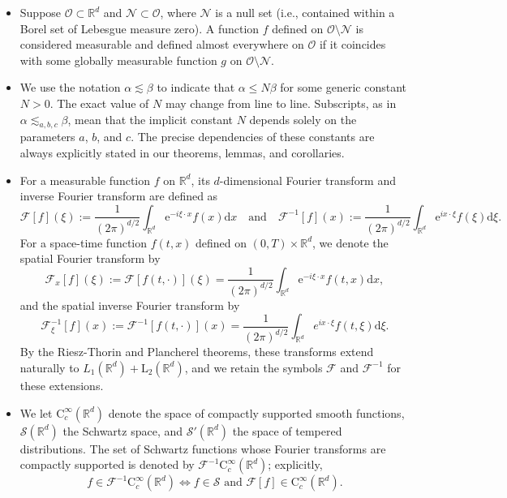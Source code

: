 \documentclass[11pt,reqno]{amsart}
\theoremstyle{definition}
\theoremstyle{remark}
\numberwithin{equation}{section}
\begin{document}
\begin{itemize}
\item Suppose $\mathcal{O} \subset \mathbb{R}^d$ and $\mathcal{N} \subset \mathcal{O}$, where $\mathcal{N}$ is a null set (i.e., contained within a Borel set of Lebesgue measure zero). A function $f$ defined on $\mathcal{O} \setminus \mathcal{N}$ is considered measurable and defined almost everywhere on $\mathcal{O}$ if it coincides with some globally measurable function $g$ on $\mathcal{O} \setminus \mathcal{N}$.

\item We use the notation $\alpha \lesssim \beta$ to indicate that $\alpha \leq N \beta$ for some generic constant $N > 0$. 
The exact value of $N$ may change from line to line. 
Subscripts, as in $\alpha \lesssim_{a,b,c} \beta$, mean that the implicit constant $N$ depends solely on the parameters $a$, $b$, and $c$.
The precise dependencies of these constants are always explicitly stated in our theorems, lemmas, and corollaries.

\item For a measurable function $f$ on $\mathbb{R}^d$, its $d$-dimensional Fourier transform and inverse Fourier transform are defined as
$$
\mathcal{F}[f](\xi) := \frac{1}{(2\pi)^{d/2}}\int_{\mathbb{R}^{d}} \mathrm{e}^{-i\xi \cdot x} f(x) \mathrm{d}x \quad \text{and} \quad \mathcal{F}^{-1}[f](x) := \frac{1}{(2\pi)^{d/2}}\int_{\mathbb{R}^{d}} \mathrm{e}^{ ix \cdot \xi} f(\xi) \mathrm{d}\xi.
$$
For a space-time function $f(t,x)$ defined on $(0,T)\times \mathbb{R}^d$, we denote the spatial Fourier transform by
$$
\mathcal{F}_x[f](\xi) := \mathcal{F}[f(t,\cdot)](\xi) = \frac{1}{(2\pi)^{d/2}}\int_{\mathbb{R}^{d}} \mathrm{e}^{ -i\xi \cdot x} f(t,x) \mathrm{d}x,
$$
and the spatial inverse Fourier transform by
$$
\mathcal{F}_\xi^{-1}[f](x) := \mathcal{F}^{-1}[f(t,\cdot)](x) = \frac{1}{(2\pi)^{d/2}}\int_{\mathbb{R}^{d}} e^{ ix \cdot \xi} f(t,\xi) \mathrm{d}\xi.
$$
By the Riesz-Thorin and Plancherel theorems, these transforms extend naturally to $L_1(\mathbb{R}^d) + \mathrm{L}_2(\mathbb{R}^d)$, and we retain the symbols $\mathcal{F}$ and $\mathcal{F}^{-1}$ for these extensions.

\item We let $\mathrm{C}_c^{\infty}(\mathbb{R}^d)$ denote the space of compactly supported smooth functions, $\mathcal{S}(\mathbb{R}^d)$ the Schwartz space, and $\mathcal{S}'(\mathbb{R}^d)$ the space of tempered distributions. The set of Schwartz functions whose Fourier transforms are compactly supported is denoted by $\mathcal{F}^{-1}\mathrm{C}_c^\infty(\mathbb{R}^d)$; explicitly,
$$
f \in \mathcal{F}^{-1}\mathrm{C}_c^\infty(\mathbb{R}^d) \iff f \in \mathcal{S} \text{ and } \mathcal{F}[f] \in \mathrm{C}_c^\infty(\mathbb{R}^d).
$$


\end{itemize}
\end{document}
